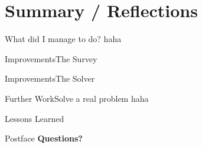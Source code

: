 \documentclass[rgb,dvipsnames]{beamer}
\begin{document}
\section{Summary / Reflections}
\begin{frame}{What did I manage to do?}
  haha
\end{frame}

\begin{frame}{Improvements}{The Survey}
  
\end{frame}

\begin{frame}{Improvements}{The Solver}
  
\end{frame}

\begin{frame}{Further Work}{Solve a real problem}
  haha
\end{frame}


\begin{frame}{Lessons Learned}
  
\end{frame}

\begin{frame}{Postface}
  \large\textbf{Questions?}
\end{frame}
\end{document}
